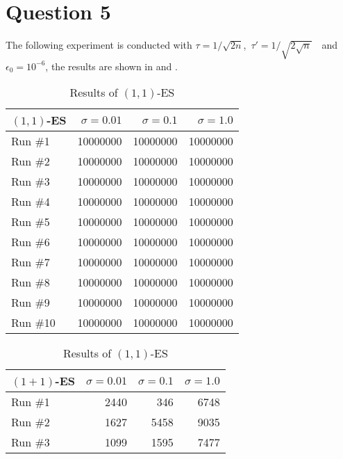 \documentclass[12pt,letterpaper]{article}
\begin{document}
\section*{Question 5}
The following experiment is conducted with $\tau = 1/\sqrt{2n}$,~$\tau' = 1/\sqrt{2\sqrt{n}}$~~and~~$\epsilon_0 = 10^{-6}$, the results are shown in  and .
\begin{table}[H]
    \parbox{.5\linewidth}{
        \centering
        \begin{tabular}{l|r|r|r}
            $(1, 1)$-ES & $\sigma = 0.01$ & $\sigma = 0.1$ & $\sigma = 1.0$ \\ \hline
            Run \#1      & 10000000       & 10000000       & 10000000       \\ \hline
            Run \#2      & 10000000       & 10000000       & 10000000       \\ \hline
            Run \#3      & 10000000       & 10000000       & 10000000       \\ \hline
            Run \#4      & 10000000       & 10000000       & 10000000       \\ \hline
            Run \#5      & 10000000       & 10000000       & 10000000       \\ \hline
            Run \#6      & 10000000       & 10000000       & 10000000       \\ \hline
            Run \#7      & 10000000       & 10000000       & 10000000       \\ \hline
            Run \#8      & 10000000       & 10000000       & 10000000       \\ \hline
            Run \#9      & 10000000       & 10000000       & 10000000       \\ \hline
            Run \#10     & 10000000       & 10000000       & 10000000       \\
        \end{tabular}
        \caption{Results of $(1, 1)$-ES}
        \label{tab:5a}
    }
    \hfill
    \parbox{.5\linewidth}{
        \centering
        \begin{tabular}{l|r|r|r}
            $(1 + 1)$-ES & $\sigma = 0.01$ & $\sigma = 0.1$ & $\sigma = 1.0$ \\ \hline
            Run \#1  & 2440     & 346     & 6748    \\ \hline
            Run \#2  & 1627     & 5458    & 9035    \\ \hline
            Run \#3  & 1099     & 1595    & 7477    \\ \hline

\end{tabular}}
\end{table}
\end{document}
